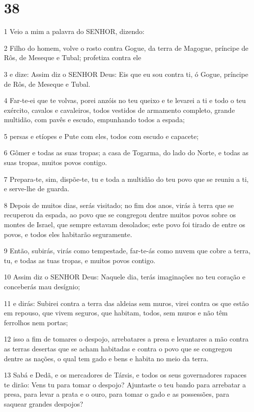 \chapter{38}

\par 1 Veio a mim a palavra do SENHOR, dizendo:
\par 2 Filho do homem, volve o rosto contra Gogue, da terra de Magogue, príncipe de Rôs, de Meseque e Tubal; profetiza contra ele
\par 3 e dize: Assim diz o SENHOR Deus: Eis que eu sou contra ti, ó Gogue, príncipe de Rôs, de Meseque e Tubal.
\par 4 Far-te-ei que te volvas, porei anzóis no teu queixo e te levarei a ti e todo o teu exército, cavalos e cavaleiros, todos vestidos de armamento completo, grande multidão, com pavês e escudo, empunhando todos a espada;
\par 5 persas e etíopes e Pute com eles, todos com escudo e capacete;
\par 6 Gômer e todas as suas tropas; a casa de Togarma, do lado do Norte, e todas as suas tropas, muitos povos contigo.
\par 7 Prepara-te, sim, dispõe-te, tu e toda a multidão do teu povo que se reuniu a ti, e serve-lhe de guarda.
\par 8 Depois de muitos dias, serás visitado; no fim dos anos, virás à terra que se recuperou da espada, ao povo que se congregou dentre muitos povos sobre os montes de Israel, que sempre estavam desolados; este povo foi tirado de entre os povos, e todos eles habitarão seguramente.
\par 9 Então, subirás, virás como tempestade, far-te-ás como nuvem que cobre a terra, tu, e todas as tuas tropas, e muitos povos contigo.
\par 10 Assim diz o SENHOR Deus: Naquele dia, terás imaginações no teu coração e conceberás mau desígnio;
\par 11 e dirás: Subirei contra a terra das aldeias sem muros, virei contra os que estão em repouso, que vivem seguros, que habitam, todos, sem muros e não têm ferrolhos nem portas;
\par 12 isso a fim de tomares o despojo, arrebatares a presa e levantares a mão contra as terras desertas que se acham habitadas e contra o povo que se congregou dentre as nações, o qual tem gado e bens e habita no meio da terra.
\par 13 Sabá e Dedã, e os mercadores de Társis, e todos os seus governadores rapaces te dirão: Vens tu para tomar o despojo? Ajuntaste o teu bando para arrebatar a presa, para levar a prata e o ouro, para tomar o gado e as possessões, para saquear grandes despojos?
